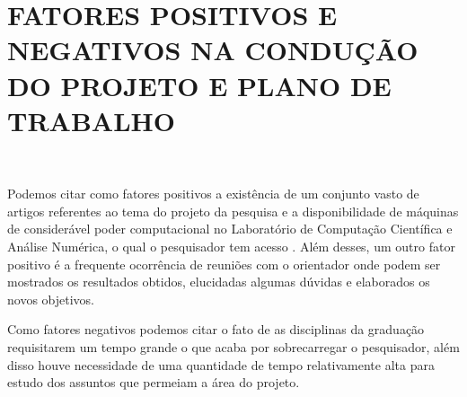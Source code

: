 \documentclass[12pt]{article}
\begin{document}
\newpage


\newpage
\newpage
\section*{\centering \textbf{FATORES POSITIVOS E NEGATIVOS NA CONDUÇÃO DO PROJETO E PLANO DE TRABALHO}}
\hrulefill \\

\vspace{0.5cm}

Podemos citar como fatores positivos a existência de um conjunto vasto de artigos referentes ao tema do projeto da pesquisa e a disponibilidade de máquinas de considerável poder computacional no Laboratório de Computação Científica e Análise Numérica, o qual o pesquisador tem acesso . Além desses, um outro fator positivo é a frequente ocorrência de reuniões com o orientador onde podem ser mostrados os resultados obtidos, elucidadas algumas dúvidas e elaborados os novos objetivos. 

Como fatores negativos podemos citar o fato de as disciplinas da graduação requisitarem um tempo grande o que acaba por sobrecarregar o pesquisador, além disso houve necessidade de uma quantidade de tempo relativamente alta para estudo dos assuntos que permeiam a área do projeto.  


\end{document}
